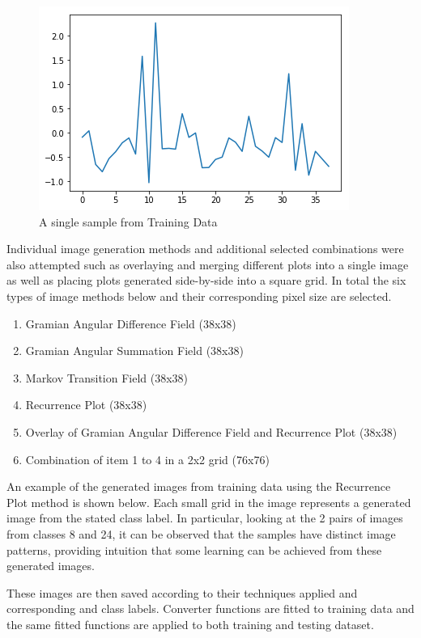 \documentclass[conference]{IEEEtran}
\begin{document}
\begin{figure}[H]
\begin{center}
\includegraphics[scale=0.5]{Image/ts_before_img.png}
\caption{\label{ts_before_img} A single sample from Training Data}
\end{center}
\end{figure}

Individual image generation methods and additional selected combinations were also attempted such as overlaying and merging different plots into a single image as well as placing plots generated side-by-side into a square grid. In total the six types of image methods below and their corresponding pixel size are selected.

\begin{enumerate}
\item Gramian Angular Difference Field (38x38)
\item Gramian Angular Summation Field (38x38)
\item Markov Transition Field (38x38)
\item Recurrence Plot (38x38)
\item Overlay of Gramian Angular Difference Field and Recurrence Plot (38x38)
\item Combination of item 1 to 4 in a 2x2 grid (76x76)
\end{enumerate}

An example of the generated images from training data using the Recurrence Plot method is shown below. Each small grid in the image represents a generated image from the stated class label. In particular, looking at the 2 pairs of images from classes 8 and 24, it can be observed that the samples have distinct image patterns, providing intuition that some learning can be achieved from these generated images.

These images are then saved according to their techniques applied and corresponding and class labels. Converter functions are fitted to training data and the same fitted functions are applied to both training and testing dataset.
\end{document}
